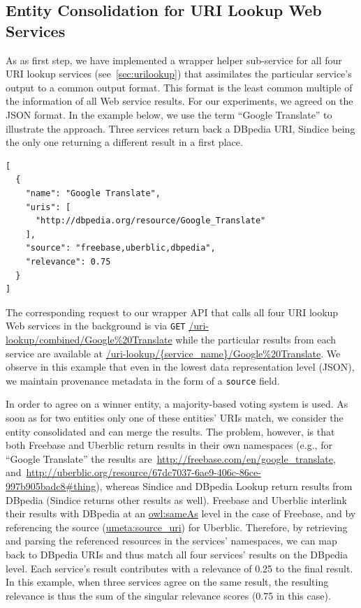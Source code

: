 \documentclass[conference]{IEEEtran}
\newcommand{\nofootnote}[1]{~#1}
\begin{document}
\subsection{Entity Consolidation for URI Lookup Web Services}               \label{sec:consolidation-uri}
As as first step, we have implemented a wrapper helper sub-service for all four URI lookup services (see~\ref{sec:urilookup}) that assimilates the particular
service's output to a common output format. This format is the least common multiple of the information of all Web
service results. For our experiments, we agreed on the JSON format. In the example below, we use the term ``Google
Translate'' to illustrate the approach. Three services return back a DBpedia URI, Sindice being the only one returning
a different result in a first place.
\begin{lstlisting}
[
  {
    "name": "Google Translate",
    "uris": [
      "http://dbpedia.org/resource/Google_Translate"
    ],
    "source": "freebase,uberblic,dbpedia",
    "relevance": 0.75
  }
]
\end{lstlisting}

The corresponding request to our wrapper API that calls all four URI lookup Web services in the background is via
\texttt{GET}
\url{/uri-lookup/combined/Google%20Translate} while the particular results from each service are available at
\url{/uri-lookup/{service_name}/Google%20Translate}.
We observe in this example that even in the lowest data representation level (JSON), we maintain provenance metadata in
the form of a \texttt{source} field.

In order to agree on a winner entity, a majority-based voting system is used. As soon as for two entities only one of
these entities' URIs match, we consider the entity consolidated and can merge the results. The problem, however, is
that both Freebase and Uberblic return results in their own namespaces (e.g., for ``Google Translate'' the results
are\nofootnote{\url{http://freebase.com/en/google_translate}},
and\nofootnote{\url{http://uberblic.org/resource/67dc7037-6ae9-406c-86ce-997b905badc8#thing}}), whereas Sindice and
DBpedia Lookup return results from DBpedia (Sindice returns other results as well). Freebase and Uberblic interlink
their results with DBpedia at an \url{owl:sameAs} level in the case of Freebase, and by referencing the source
(\url{umeta:source_uri}) for Uberblic. Therefore, by retrieving and parsing the referenced resources in the services'
namespaces, we can map back to DBpedia URIs and thus match all four services' results on the DBpedia level. Each
service's result contributes with a relevance of 0.25 to the final result. In this example, when three services agree
on the same result, the resulting relevance is thus the sum of the singular relevance scores (0.75 in this case).
\end{document}
